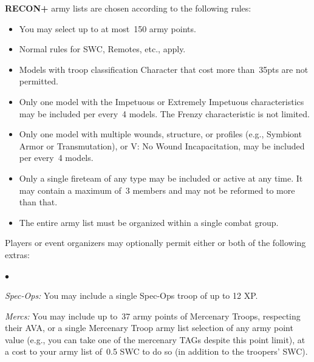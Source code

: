 \documentclass[14pt,dvipsnames]{extarticle}
\newenvironment{squishitemize}
{\begin{list}{$\bullet$}{%
    \setlength{\itemsep}{2pt}%
    \setlength{\parsep}{2pt}%
    \setlength{\topsep}{2pt}%
    \setlength{\parskip}{0pt} %
    \renewcommand{\labelitemi}{--}}}
  {\end{list}}
\newcommand{\reconplus}{\textbf{RECON+}\xspace}
\begin{document}
\reconplus army lists are chosen according to the following rules:

\vspace{-1em}
\begin{itemize}
\item You may select up to at most~150 army points.
\item Normal rules for SWC, Remotes, etc., apply.
\item Models with troop classification Character that cost more
  than~35pts are not permitted.
\item Only one model with the Impetuous or Extremely Impetuous
  characteristics may be included per every~4 models.  The Frenzy
  characteristic is not limited.


\item Only one model with multiple wounds, structure, or profiles
  (e.g., Symbiont Armor or Transmutation), or V: No Wound
  Incapacitation, may be included per every~4 models.
  
\item Only a single fireteam of any type may be included or active at
  any time.  It may contain a maximum of~3 members and may not be
  reformed to more than that.
\item The entire army list must be organized within a single combat
  group.
\end{itemize}

Players or event organizers may optionally permit either or both of
the following extras:

\begin{squishitemize}
\item \emph{Spec-Ops:} You may include a single Spec-Ops troop of up to 12 XP.
\item \emph{Mercs:} You may include up to~37 army points of Mercenary
  Troops, respecting their AVA, or a single Mercenary Troop army list
  selection of any army point value (e.g., you can take one of the
  mercenary TAGs despite this point limit), at a cost to your army
  list of~0.5 SWC to do so (in addition to the troopers' SWC).

\end{squishitemize}
\end{document}
